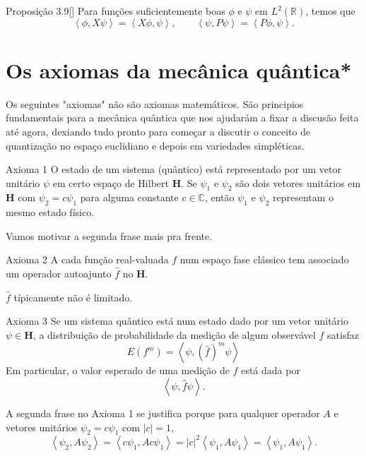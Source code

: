 \begin{thing7}{Proposição 3.9}[\cite{hallq}]\leavevmode
	Para funções suficientemente boas $\phi$ e $\psi$ em $L^2(\mathbb{R})$, temos que
	\[\left<\phi,X\psi\right> =\left<X\phi,\psi\right>,\qquad \left<\psi,P\psi\right>=\left<P\phi,\psi\right>.\]
\end{thing7}

\section{Os axiomas da mecânica quântica*}

Os seguintes "axiomas" não são axiomas matemáticos. São principios fundamentais para a mecânica quântica que nos ajudarám a fixar a discusão feita até agora, dexiando tudo pronto para começar a discutir o conceito de quantização no espaço euclidiano e depois em variedades simpléticas.

\begin{thing1}{Axioma 1}\leavevmode
	O estado de um sistema (quântico) está representado por um vetor unitário $\psi$ em certo espaço de Hilbert $\mathbf{H}$. Se $\psi_1$ e $\psi_2$ são dois vetores unitários em $\mathbf{H}$ com $\psi_2=c\psi_1$ para alguma constante $c \in \mathbb{C}$, então $\psi_1$ e $\psi_2$ representam o mesmo estado físico.
\end{thing1}

Vamos motivar a segunda frase mais pra frente.

\begin{thing1}{Axioma 2}\leavevmode
	A cada função real-valuada $f$ num espaço fase clássico tem associado um operador autoajunto $\hat{f}$ no $\mathbf{H}$.
\end{thing1}

\begin{remark}\leavevmode
	$\hat{f}$ típicamente não é limitado.
\end{remark}

\begin{thing1}{Axioma 3}\leavevmode
	Se um sistema quântico está num estado dado por um vetor unitário  $\psi \in \mathbf{H}$, a distribuição de probabilidade da medição de algum observável $f$ satisfaz
	\[E(f^m)=\left<\psi,(\hat{f})^m\psi\right>\]
	Em particular, o valor esperado de uma medição de $f$ está dada por
	\[\left<\psi,\hat{f}\psi\right>.\]
\end{thing1}

A segunda frase no Axioma 1 se justifica porque para qualquer operador $A$ e vetores unitários $\psi_2=c\psi_1$ com $|c|=1$,
\[\left<\psi_2,A\psi_2\right>=\left<c\psi_1,Ac\psi_1\right>=|c|^2\left<\psi_1,A\psi_1\right>=\left<\psi_1,A\psi_1\right>.\]

